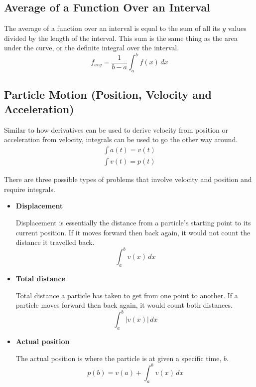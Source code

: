 \documentclass[12pt]{article}
\begin{document}
        \subsection{Average of a Function Over an Interval} %
            The average of a function over an interval is equal to the sum of all its $y$ values divided by the length of the interval. This sum is the same thing as the area under the curve, or the definite integral over the interval.
            \[ f_{avg} = \frac{1}{b-a} \int_{a}^{b} f(x) \, dx \]

        \subsection{Particle Motion (Position, Velocity and Acceleration)}
            Similar to how derivatives can be used to derive velocity from position or acceleration from velocity, integrals can be used to go the other way around.
            \begin{gather*}
                \int a(t) = v(t) \\
                \int v(t) = p(t)
            \end{gather*}

            There are three possible types of problems that involve velocity and position and require integrals.
            \begin{itemize}
                \item \textbf{Displacement}

                Displacement is essentially the distance from a particle's starting point to its current position. If it moves forward then back again, it would not count the distance it travelled back.
                \[ \int_{a}^{b} v(x) \, dx \]

                \item \textbf{Total distance}

                Total distance a particle has taken to get from one point to another. If a particle moves forward then back again, it would count both distances.
                \[ \int_{a}^{b} |v(x)| \, dx \]

                \item \textbf{Actual position}

                The actual position is where the particle is at given a specific time, $b$.
                \[ p(b) = v(a) + \int_{a}^{b} v(x) \, dx \]
            \end{itemize}
\end{document}
